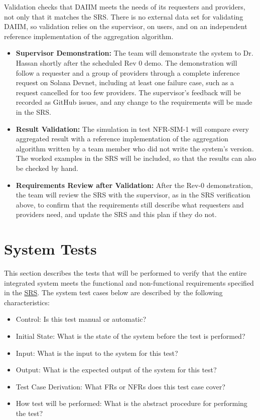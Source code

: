 \documentclass[12pt]{article}
\begin{document}

Validation checks that DAIIM meets the needs of its requesters and providers, not only that it matches the
SRS. There is no external data set for validating DAIIM, so validation relies on the supervisor, on users, and
on an independent reference implementation of the aggregation algorithm.

\begin{itemize}
  \item \textbf{Supervisor Demonstration: } The team will demonstrate the system to Dr. Hassan shortly after
  the scheduled Rev 0 demo. The demonstration will follow a requester and a group of providers through a
  complete inference request on Solana Devnet, including at least one failure case, such as a request
  cancelled for too few providers. The supervisor's feedback will be recorded as GitHub issues, and any change
  to the requirements will be made in the SRS.
  \item \textbf{Result Validation: } The simulation in test NFR-SIM-1 will compare every aggregated result
  with a reference implementation of the aggregation algorithm written by a team member who did not write the
  system's version. The worked examples in the SRS will be included, so that the results can also be checked
  by hand.
  \item \textbf{Requirements Review after Validation: } After the Rev-0 demonstration, the
  team will review the SRS with the supervisor, as in the SRS verification above, to confirm that the
  requirements still describe what requesters and providers need, and update the SRS and this plan if they do
  not.
\end{itemize}

\section{System Tests}


This section describes the tests that will be performed to verify that the entire integrated
system meets the functional and non-functional requirements specified in the \href{../SRS/SRS.pdf}{SRS}. The
system test cases below are described by the following characteristics:
\begin{itemize}
  \item Control: Is this test manual or automatic?
  \item Initial State: What is the state of the system before the test is performed?
  \item Input: What is the input to the system for this test?
  \item Output: What is the expected output of the system for this test?
  \item Test Case Derivation: What FRs or NFRs does this test case cover?
  \item How test will be performed: What is the abstract procedure for performing the test?
\end{itemize}
\end{document}
